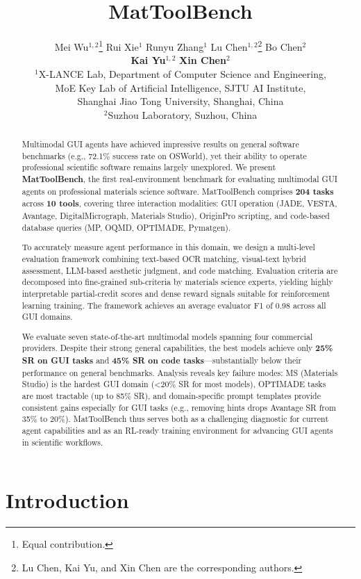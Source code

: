 \documentclass{article}
\title{MatToolBench}
\author{%
  Mei Wu$^{1,2}$\thanks{Equal contribution.} \quad
  Rui Xie$^{1}$\footnotemark[1] \quad
  Runyu Zhang$^{1}$ \quad
  Lu Chen$^{1,2}$\thanks{Lu Chen, Kai Yu, and Xin Chen are the corresponding authors.} \quad
  Bo Chen$^{2}$ \\[0.3em]
  \textbf{Kai Yu}$^{1,2}$\footnotemark[2] \quad
  \textbf{Xin Chen}$^{2}$\footnotemark[2] \\[0.5em]
  $^{1}$X-LANCE Lab, Department of Computer Science and Engineering, \\
  MoE Key Lab of Artificial Intelligence, SJTU AI Institute, \\
  Shanghai Jiao Tong University, Shanghai, China \\
  $^{2}$Suzhou Laboratory, Suzhou, China \\
}
\begin{document}
\maketitle


\begin{abstract}
Multimodal GUI agents have achieved impressive results on general software benchmarks
(e.g., 72.1\% success rate on OSWorld), yet their ability to operate professional scientific
software remains largely unexplored.
We present \textbf{MatToolBench}, the first real-environment benchmark for evaluating
multimodal GUI agents on professional materials science software.
MatToolBench comprises \textbf{204 tasks} across \textbf{10 tools}, covering three interaction
modalities: GUI operation (JADE, VESTA, Avantage, DigitalMicrograph, Materials Studio),
OriginPro scripting, and code-based database queries (MP, OQMD, OPTIMADE, Pymatgen).

To accurately measure agent performance in this domain, we design a multi-level evaluation
framework combining text-based OCR matching, visual-text hybrid assessment, LLM-based
aesthetic judgment, and code matching.
Evaluation criteria are decomposed into fine-grained sub-criteria by materials science experts,
yielding highly interpretable partial-credit scores and dense reward signals suitable for
reinforcement learning training.
The framework achieves an average evaluator F1 of 0.98 across all GUI domains.

We evaluate seven state-of-the-art multimodal models spanning four commercial providers.
Despite their strong general capabilities, the best models achieve only \textbf{25\% SR on GUI tasks}
and \textbf{45\% SR on code tasks}—substantially below their performance on general benchmarks.
Analysis reveals key failure modes: MS (Materials Studio) is the hardest GUI domain
(\textless20\% SR for most models), OPTIMADE tasks are most tractable (up to 85\% SR),
and domain-specific prompt templates provide consistent gains especially for GUI tasks
(e.g., removing hints drops Avantage SR from 35\% to 20\%).
MatToolBench thus serves both as a challenging diagnostic for current agent capabilities
and as an RL-ready training environment for advancing GUI agents in scientific workflows.
\end{abstract}



\section{Introduction}
\end{document}
